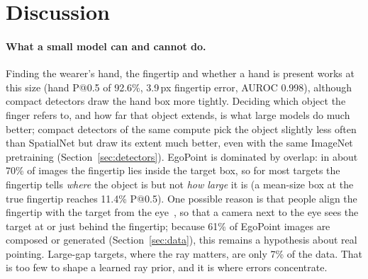 \section{Discussion}\label{sec:discussion}

\paragraph{What a small model can and cannot do.} Finding the wearer's hand, the fingertip and whether a hand is present works at this size (hand P@0.5 of 92.6\%, 3.9\,px fingertip error, AUROC 0.998), although compact detectors draw the hand box more tightly. Deciding which object the finger refers to, and how far that object extends, is what large models do much better; compact detectors of the same compute pick the object slightly less often than SpatialNet but draw its extent much better, even with the same ImageNet pretraining (Section~\ref{sec:detectors}). EgoPoint is dominated by overlap: in about 70\% of images the fingertip lies inside the target box, so for most targets the fingertip tells \emph{where} the object is but not \emph{how large} it is (a mean-size box at the true fingertip reaches 11.4\% P@0.5). One possible reason is that people align the fingertip with the target from the eye~\cite{mayer2015modeling,plaumann2018towards}, so that a camera next to the eye sees the target at or just behind the fingertip; because 61\% of EgoPoint images are composed or generated (Section~\ref{sec:data}), this remains a hypothesis about real pointing. Large-gap targets, where the ray matters, are only 7\% of the data. That is too few to shape a learned ray prior, and it is where errors concentrate.

